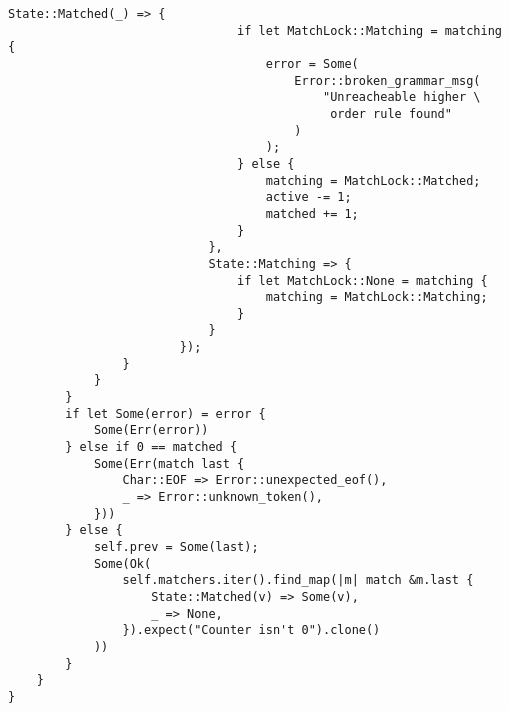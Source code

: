 \begin{lstlisting}[caption={Типаж лексического анализатора и его стандартная реализация (часть 6)}, label={lst:rust_lexer6}]
                            State::Matched(_) => {
                                if let MatchLock::Matching = matching {
                                    error = Some(
                                        Error::broken_grammar_msg(
                                            "Unreacheable higher \
                                             order rule found"
                                        )
                                    );
                                } else {
                                    matching = MatchLock::Matched;
                                    active -= 1;
                                    matched += 1;
                                }
                            },
                            State::Matching => {
                                if let MatchLock::None = matching {
                                    matching = MatchLock::Matching;
                                }
                            }
                        });
                }
            }
        }
        if let Some(error) = error {
            Some(Err(error))
        } else if 0 == matched {
            Some(Err(match last {
                Char::EOF => Error::unexpected_eof(),
                _ => Error::unknown_token(),
            }))
        } else {
            self.prev = Some(last);
            Some(Ok(
                self.matchers.iter().find_map(|m| match &m.last {
                    State::Matched(v) => Some(v),
                    _ => None,
                }).expect("Counter isn't 0").clone()
            ))
        }
    }
}
\end{lstlisting}

\clearpage

